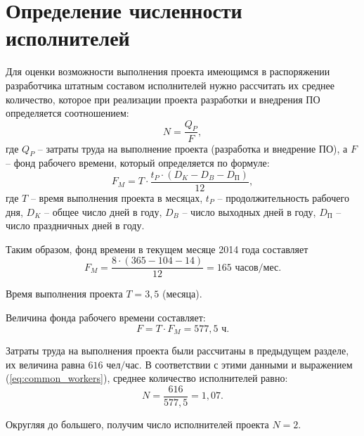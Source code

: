 \section{Определение численности исполнителей} \label{workers}

Для оценки возможности выполнения проекта имеющимся в распоряжении разработчика штатным составом исполнителей нужно рассчитать их среднее количество, которое при реализации проекта разработки и внедрения ПО определяется соотношением:
\begin{equation}
  \label{eq:common_workers}
N = \frac {Q_P} {F},
\end{equation}
где $Q_P$ -- затраты труда на выполнение проекта (разработка и внедрение ПО), а $F$ -- фонд рабочего времени, который определяется по формуле:
\begin{equation}
  \label{eq:time_fund_month_common}
F_M = T \cdot \frac {t_P \cdot (D_K - D_B - D_\textrm{П})} {12},
\end{equation}
где $T$ -- время выполнения проекта в месяцах, $t_P$ -- продолжительность рабочего дня, $D_K$ -- общее число дней в году, $D_B$ -- число выходных дней в году, $D_\textrm{П}$ -- число праздничных дней в году.

\vspace{\baselineskip}
Таким образом, фонд времени в текущем месяце 2014 года составляет
\begin{equation}
  \label{eq:time_fund_month}
F_M = \frac {8 \cdot (365 - 104 - 14)} {12} = 165 \textrm{ часов/мес}.
\end{equation}

Время выполнения проекта $T = 3,5$ (месяца).

\vspace{\baselineskip}
Величина фонда рабочего времени составляет:
\begin{equation}
  \label{eq:time_fund}
F = T \cdot F_M = 577,5 \textrm{ ч}.
\end{equation}

Затраты труда на выполнения проекта были рассчитаны в предыдущем разделе, их величина равна $616 \textrm{ чел/час}$. В соответствии с этими данными и выражением (\ref{eq:common_workers}), среднее количество исполнителей равно:
\begin{equation}
  \label{eq:workers_avg}
N = \frac {616} {577,5} = 1,07.
\end{equation}

Округляя до большего, получим число исполнителей проекта $N = 2$. 